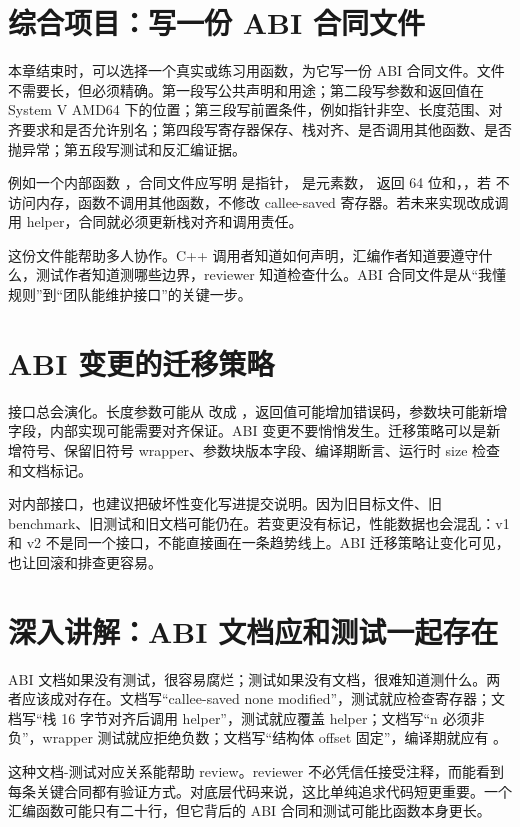 \section{综合项目：写一份 ABI 合同文件}

本章结束时，可以选择一个真实或练习用函数，为它写一份 ABI 合同文件。文件不需要长，但必须精确。第一段写公共声明和用途；第二段写参数和返回值在 System V AMD64 下的位置；第三段写前置条件，例如指针非空、长度范围、对齐要求和是否允许别名；第四段写寄存器保存、栈对齐、是否调用其他函数、是否抛异常；第五段写测试和反汇编证据。

例如一个内部函数 ，合同文件应写明  是指针， 是元素数， 返回 64 位和，，若  不访问内存，函数不调用其他函数，不修改 callee-saved 寄存器。若未来实现改成调用 helper，合同就必须更新栈对齐和调用责任。

这份文件能帮助多人协作。C++ 调用者知道如何声明，汇编作者知道要遵守什么，测试作者知道测哪些边界，reviewer 知道检查什么。ABI 合同文件是从“我懂规则”到“团队能维护接口”的关键一步。

\section{ABI 变更的迁移策略}

接口总会演化。长度参数可能从  改成 ，返回值可能增加错误码，参数块可能新增字段，内部实现可能需要对齐保证。ABI 变更不要悄悄发生。迁移策略可以是新增符号、保留旧符号 wrapper、参数块版本字段、编译期断言、运行时 size 检查和文档标记。

对内部接口，也建议把破坏性变化写进提交说明。因为旧目标文件、旧 benchmark、旧测试和旧文档可能仍在。若变更没有标记，性能数据也会混乱：v1 和 v2 不是同一个接口，不能直接画在一条趋势线上。ABI 迁移策略让变化可见，也让回滚和排查更容易。

\section{深入讲解：ABI 文档应和测试一起存在}

ABI 文档如果没有测试，很容易腐烂；测试如果没有文档，很难知道测什么。两者应该成对存在。文档写“callee-saved none modified”，测试就应检查寄存器；文档写“栈 16 字节对齐后调用 helper”，测试就应覆盖 helper；文档写“n 必须非负”，wrapper 测试就应拒绝负数；文档写“结构体 offset 固定”，编译期就应有 。

这种文档-测试对应关系能帮助 review。reviewer 不必凭信任接受注释，而能看到每条关键合同都有验证方式。对底层代码来说，这比单纯追求代码短更重要。一个汇编函数可能只有二十行，但它背后的 ABI 合同和测试可能比函数本身更长。

